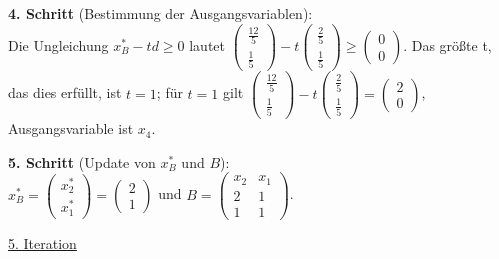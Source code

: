 \documentclass[10pt,a4paper,oneside,ngerman,numbers=noenddot]{scrartcl}
\begin{document}
		\textbf{4. Schritt} (Bestimmung der Ausgangsvariablen):\\
		Die Ungleichung $x_{B}^{*} - td \geq 0$ lautet $\begin{pmatrix} \frac{12}{5} \\ \frac{1}{5} \end{pmatrix} - t \begin{pmatrix} \frac{2}{5} \\ \frac{1}{5} \end{pmatrix} \geq \begin{pmatrix} 0 \\ 0  \end{pmatrix}$. Das größte t, das dies erfüllt, ist $t = 1$; für $t = 1$ gilt $\begin{pmatrix} \frac{12}{5} \\ \frac{1}{5}\end{pmatrix} - t \begin{pmatrix} \frac{2}{5} \\ \frac{1}{5} \end{pmatrix} = \begin{pmatrix} 2 \\ 0 \end{pmatrix}$, Ausgangsvariable ist $x_{4}$.
		
		\textbf{5. Schritt} (Update von $x_{B}^{*}$ und $B$):\\
		$x_{B}^{*} = \begin{pmatrix} x_{2}^{*} \\ x_{1}^{*} \end{pmatrix} = \begin{pmatrix} 2 \\ 1 \end{pmatrix}$ und $B = \begin{pmatrix} x_{2} & x_{1} \\ 2 & 1 \\ 1 & 1 \end{pmatrix}$.
		
		\underline{5. Iteration}
		
\end{document}
